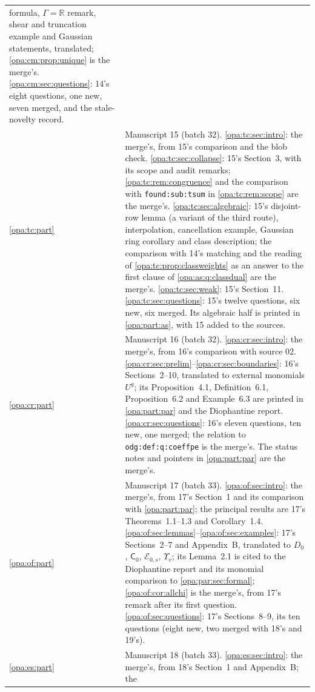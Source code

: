 \documentclass[11pt,oneside]{article}
\numberwithin{equation}{section}
\theoremstyle{definition}
\theoremstyle{remark}
\newcommand{\R}{\mathbb R}
\newcommand{\EE}{\mathcal E}
\newcommand{\lbl}[1]{\nolinkurl{#1}}
\begin{document}
\begin{center}
\begin{longtable}{>{\raggedright\arraybackslash}p{}>{\raggedright\arraybackslash}p{}}
formula, $\Gamma=\R$ remark, shear and truncation example and Gaussian statements, translated;
\cref{opa:cm:prop:unique} is the merge's. \ref{opa:cm:sec:questions}: 14's eight questions, one
new, seven merged, and the stale-novelty record.\\
\cref{opa:tc:part} & Manuscript 15 (batch 32). \ref{opa:tc:sec:intro}: the merge's, from 15's comparison
and the blob check. \ref{opa:tc:sec:collapse}: 15's Section~3, with its scope and audit remarks;
\cref{opa:tc:rem:congruence} and the comparison with \lbl{found:sub:tsum} in \cref{opa:tc:rem:scope} are the
merge's. \ref{opa:tc:sec:algebraic}: 15's disjoint-row lemma (a variant of the third route), interpolation,
cancellation example, Gaussian ring corollary and class description; the comparison with 14's matching and the
reading of \cref{opa:tc:prop:classweights} as an answer to the first clause of \cref{opa:as:q:classdual} are the
merge's. \ref{opa:tc:sec:weak}: 15's Section~11. \ref{opa:tc:sec:questions}: 15's twelve questions, six new, six
merged. Its algebraic half is printed in \cref{opa:part:as}, with 15 added to the sources.\\
\cref{opa:cr:part} & Manuscript 16 (batch 32). \ref{opa:cr:sec:intro}: the merge's, from 16's comparison with
source 02. \ref{opa:cr:sec:prelim}--\ref{opa:cr:sec:boundaries}: 16's Sections~2--10, translated to external
monomials $U^g$; its Proposition~4.1, Definition~6.1, Proposition~6.2 and Example~6.3 are printed in
\cref{opa:part:par} and the Diophantine report. \ref{opa:cr:sec:questions}: 16's eleven questions, ten new, one
merged; the relation to \lbl{odg:def:q:coeffpe} is the merge's. The status notes and pointers in
\cref{opa:part:par} are the merge's.\\
\cref{opa:of:part} & Manuscript 17 (batch 33). \ref{opa:of:sec:intro}: the merge's, from 17's Section~1 and its comparison with
\cref{opa:part:par}; the principal results are 17's Theorems~1.1--1.3 and Corollary~1.4. \ref{opa:of:sec:lemmas}--\ref{opa:of:sec:examples}:
17's Sections~2--7 and Appendix~B, translated to $D_0$, $\mathsf C_0$, $\EE_{0,s}$, $\Upsilon_v$; its Lemma~2.1 is cited to the Diophantine
report and its monomial comparison to \cref{opa:par:sec:formal}; \cref{opa:of:cor:allchi} is the merge's, from 17's remark after its
first question. \ref{opa:of:sec:questions}: 17's Sections~8--9, its ten questions (eight new, two merged with 18's and 19's).\\
\cref{opa:es:part} & Manuscript 18 (batch 33). \ref{opa:es:sec:intro}: the merge's, from 18's Section~1 and Appendix~B; the

\end{longtable}
\end{center}
\end{document}
